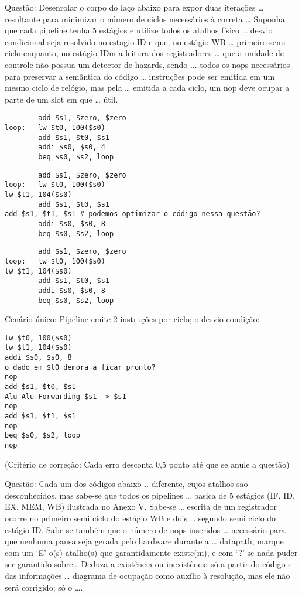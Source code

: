 \documentclass{article}
\begin{document}
Questão: Desenrolar o corpo do laço abaixo para expor duas iterações …
resultante para minimizar o número de ciclos necessários à correta … Suponha
que cada pipeline tenha 5 estágios e utilize todos os atalhos físico … desvio
condicional seja resolvido no estagio ID e que, no estágio WB … primeiro semi
ciclo enquanto, no estágio IDm a leitura dos registradores … que a unidade de
controle não possua um detector de hazards, sendo ... todos os nops necessários
para preservar a semântica do código … instruções pode ser emitida em um mesmo
ciclo de relógio, mas pela … emitida a cada ciclo, um nop deve ocupar a parte
de um slot em que … útil.


\begin{verbatim}
        add $s1, $zero, $zero
loop:   lw $t0, 100($s0)
        add $s1, $t0, $s1
        addi $s0, $s0, 4
        beq $s0, $s2, loop
\end{verbatim}


\begin{verbatim}
        add $s1, $zero, $zero
loop:   lw $t0, 100($s0)
lw $t1, 104($s0)
        add $s1, $t0, $s1
add $s1, $t1, $s1 # podemos optimizar o código nessa questão?
        addi $s0, $s0, 8
        beq $s0, $s2, loop
\end{verbatim}


\begin{verbatim}
        add $s1, $zero, $zero
loop:   lw $t0, 100($s0)
lw $t1, 104($s0)
        add $s1, $t0, $s1
        addi $s0, $s0, 8
        beq $s0, $s2, loop
\end{verbatim}


Cenário único: Pipeline emite 2 instruções por ciclo; o desvio condição:
\begin{verbatim}
lw $t0, 100($s0)
lw $t1, 104($s0)
addi $s0, $s0, 8
o dado em $t0 demora a ficar pronto?
nop
add $s1, $t0, $s1
Alu Alu Forwarding $s1 -> $s1
nop
add $s1, $t1, $s1
nop
beq $s0, $s2, loop
nop
\end{verbatim}

(Critério de correção: Cada erro desconta 0,5 ponto até que se anule a questão)

Questão: Cada um dos códigos abaixo .. diferente, cujos atalhos sao
desconhecidos, mas sabe-se que todos os pipelines … basica de 5 estágios (IF,
ID, EX, MEM, WB) ilustrada no Anexo V. Sabe-se  … escrita de um registrador
ocorre no primeiro semi ciclo do estágio WB e dois … segundo semi ciclo do
estágio ID. Sabe-se também que o número de nops inseridos … necessário para que
nenhuma pausa seja gerada pelo hardware durante a … datapath, marque com um ‘E’
o(s) atalho(s) que garantidamente existe(m), e com ‘?’ se nada puder ser
garantido sobre… Deduza a existência ou inexistência só a partir do código e
das informações … diagrama de ocupação como auxílio à resolução, mas ele não
será corrigido; só o ….
\end{document}
